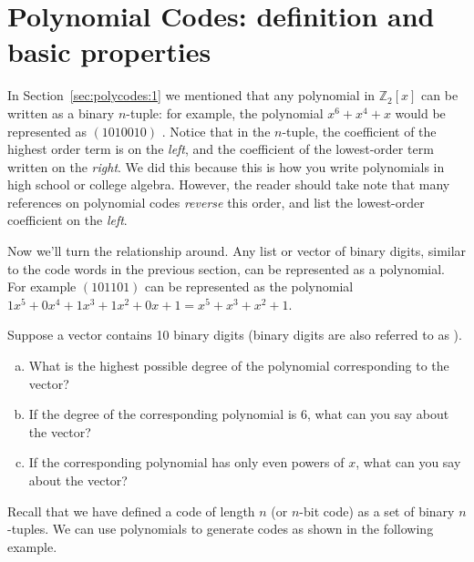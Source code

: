 \section{Polynomial Codes: definition and basic properties}
\label{sec:PolynomialCodes:DefinitionAndProperties}

In Section~\ref{sec:polycodes:1} we mentioned that  any polynomial in $\mathbb{Z}_2[x]$ can be written as a binary $n$-tuple: for example, the polynomial $x^6 + x^4 + x$ would be represented as $(1010010)$ . Notice that in the $n$-tuple, the coefficient of the highest order term is on the \emph{left}, and the coefficient of the lowest-order term written on the \emph{right}.  We did this because this is how you write polynomials in high school or college algebra.  However, the reader should take note that many references on polynomial codes  \emph{reverse} this order, and list the lowest-order coefficient on the \emph{left}.

Now we'll turn the relationship around. Any list or vector of binary digits, similar to the code words in the previous section, can be represented as a polynomial. For example $(101101)$ can be represented as the polynomial $1x^5 + 0x^4 + 1x^3 + 1x^2 + 0x + 1 = x^5 + x^3 + x^2 + 1$.  

\begin{exercise}{}
Suppose a vector contains 10 binary digits (binary digits are also referred to as ).
\begin{enumerate}[(a)]
\item
 What is the highest possible degree of the polynomial corresponding to the vector?
\item
If the degree of the corresponding polynomial is 6, what can you say about the vector?
\item
If the corresponding polynomial has only even powers of $x$, what can you say about the vector?
\end{enumerate}
\end{exercise}

Recall that we have defined a code of length $n$ (or $n$-bit code) as a set of binary $n$-tuples.  We can use polynomials to generate codes as shown in the following example. 

